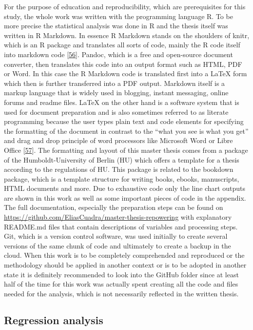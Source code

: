 \documentclass[a4paper,11pt]{article}
\begin{document}
For the purpose of education and reproducibility, which are prerequisites for this study, the whole work was written with the programming language R. To be more precise the statistical analysis was done in R and the thesis itself was written in R Markdown. In essence R Markdown stands on the shoulders of knitr, which is an R package and translates all sorts of code, mainly the R code itself into markdown code {[}\protect\hyperlink{ref-YihuiXieJ.J.AllaireGarrettGrolemund.2021}{56}{]}. Pandoc, which is a free and open-source document converter, then translates this code into an output format such as HTML, PDF or Word. In this case the R Markdown code is translated first into a LaTeX form which then is further transferred into a PDF output. Markdown itself is a markup language that is widely used in blogging, instant messaging, online forums and readme files. LaTeX on the other hand is a software system that is used for document preparation and is also sometimes referred to as literate programming because the user types plain text and code elements for specifying the formatting of the document in contrast to the ``what you see is what you get'' and drag and drop principle of word processors like Microsoft Word or Libre Office {[}\protect\hyperlink{ref-LaTeX.2021}{57}{]}. The formatting and layout of this master thesis comes from a package of the Humboldt-University of Berlin (HU) which offers a template for a thesis according to the regulations of HU. This package is related to the bookdown package, which is a template structure for writing books, ebooks, manuscripts, HTML documents and more. Due to exhaustive code only the line chart outputs are shown in this work as well as some important pieces of code in the appendix. The full documentation, especially the preparation steps can be found on \url{https://github.com/EliasCuadra/master-thesis-repowering} with explanatory README.md files that contain descriptions of variables and processing steps. Git, which is a version control software, was used initially to create several versions of the same chunk of code and ultimately to create a backup in the cloud. When this work is to be completely comprehended and reproduced or the methodology should be applied in another context or is to be adopted in another state it is definitely recommended to look into the GitHub folder since at least half of the time for this work was actually spent creating all the code and files needed for the analysis, which is not necessarily reflected in the written thesis.

\hypertarget{regression-analysis}{%
\subsection{Regression analysis}\label{regression-analysis}}
\end{document}
